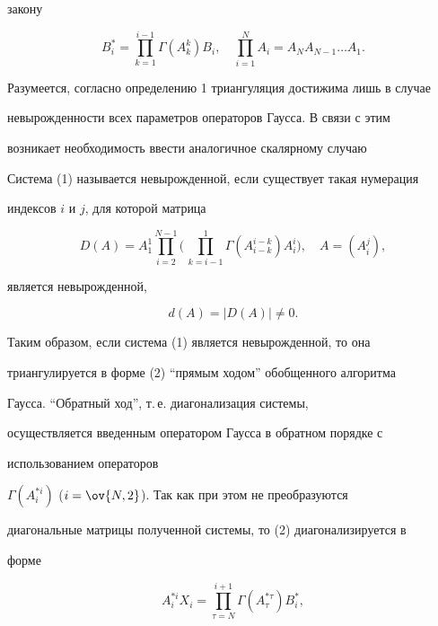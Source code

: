 закону 


$$ 


B^*_i=\prod^{i-1}_{k=1}\Gamma(A^k_k)B_i,\quad 


\prod^N_{i=1}A_i=A_N A_{N-1}\dotsc A_1. 


$$ 


Разумеется, согласно определению 1 триангуляция достижима лишь в случае 


невырожденности всех параметров операторов Гаусса. В связи с этим 


возникает необходимость ввести аналогичное скалярному случаю


 


\begin{defn} 


Система (1) называется невырожденной, если существует такая нумерация 


индексов $i$ и $j$, для которой матрица 


$$ 


D(A)=A^1_1\prod^{N-1}_{i=2}\biggl(\,\prod^1_{k=i-1} 


\Gamma(A^{i-k}_{i-k})A^i_i\biggr),\quad A=(A^j_i), 


$$ 


является невырожденной, 


\begin{equation} 


d(A)=|D(A)|\ne 0. 


\end{equation} 


\end{defn} 


 


Таким образом, если система (1) является невырожденной, то она 


триангулируется в форме (2) ``прямым ходом'' обобщенного алгоритма 


Гаусса. ``Обратный ход'', т.\,е.{} диагонализация системы, 


осуществляется введенным оператором Гаусса в обратном порядке с


использованием операторов 


$\Gamma(A^{*i}_i)$ ($i=\ov{N,2}$). Так как при этом не преобразуются 


диагональные матрицы полученной системы, то (2) диагонализируется в 


форме 


\begin{equation} 


A^{*i}_i X_i=\prod^{i+1}_{\tau=N}\Gamma(A^{*\tau}_\tau)B^*_i, 


\end{equation} 


